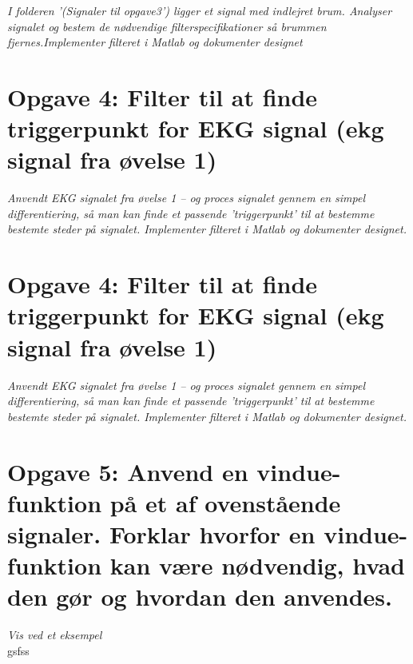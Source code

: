 \documentclass[a4paper]{report}
\begin{document}
\textit{I folderen '(Signaler til opgave3') ligger et signal med indlejret brum. Analyser signalet og bestem de nødvendige filterspecifikationer så brummen fjernes.Implementer filteret i Matlab og dokumenter designet}\\

\section*{Opgave 4: Filter til at finde triggerpunkt for EKG signal (ekg signal fra øvelse 1)}
\textit{Anvendt EKG signalet fra øvelse 1 – og proces signalet gennem en simpel  differentiering, så man kan finde et passende ’triggerpunkt’ til at bestemme bestemte steder på signalet. Implementer filteret i Matlab og dokumenter designet.}\\

\section*{Opgave 4: Filter til at finde triggerpunkt for EKG signal (ekg signal fra øvelse 1)}
\textit{Anvendt EKG signalet fra øvelse 1 – og proces signalet gennem en simpel  differentiering, så man kan finde et passende ’triggerpunkt’ til at bestemme bestemte steder på signalet. Implementer filteret i Matlab og dokumenter designet.
}\\

\section*{Opgave 5: Anvend en vindue-funktion på et af ovenstående signaler. Forklar hvorfor en vindue-funktion kan være nødvendig, hvad den gør og hvordan den anvendes.}
\textit{Vis ved et eksempel}\\


gsfss
\end{document}
